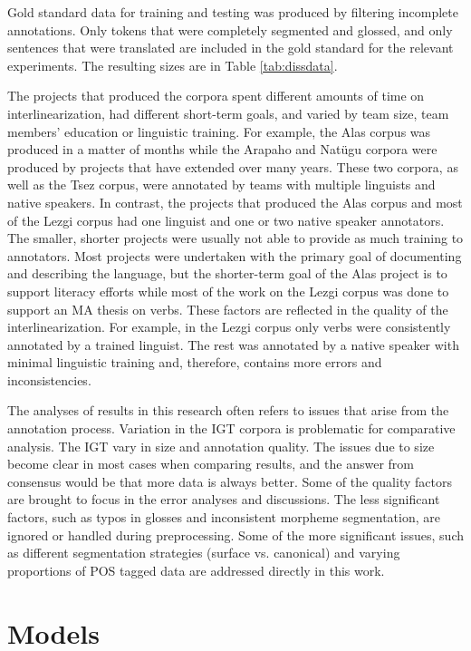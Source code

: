 Gold standard data for training and testing was produced by filtering incomplete annotations. Only tokens that were completely segmented and glossed, and only sentences that were translated are included in the gold standard for the relevant experiments. The resulting sizes are in Table \ref{tab:dissdata}.

The projects that produced the corpora spent different amounts of time on interlinearization, had different short-term goals, and varied by team size, team members' education or linguistic training. For example, the Alas corpus was produced in a matter of months while the Arapaho and Natügu corpora were produced by projects that have extended over many years. These two corpora, as well as the Tsez corpus, were annotated by teams with multiple linguists and native speakers. In contrast, the projects that produced the Alas corpus and most of the Lezgi corpus had one linguist and one or two native speaker annotators. The smaller, shorter projects were usually not able to provide as much training to annotators. Most projects were undertaken with the primary goal of documenting and describing the language, but the shorter-term goal of the Alas project is to support literacy efforts while most of the work on the Lezgi corpus was done to support an MA thesis on verbs. These factors are reflected in the quality of the interlinearization. For example, in the Lezgi corpus only verbs were consistently annotated by a trained linguist. The rest was annotated by a native speaker with minimal linguistic training and, therefore, contains more errors and inconsistencies. 

The analyses of results in this research often refers to issues that arise from the annotation process. 
Variation in the IGT corpora is problematic for comparative analysis. The IGT vary in size and annotation quality. The issues due to size become clear in most cases when comparing results, and the answer from consensus would be that more data is always better. Some of the quality factors are brought to focus in the error analyses and discussions.
The less significant factors, such as typos in glosses and inconsistent morpheme segmentation, are ignored or handled during preprocessing. Some of the more significant issues, such as different segmentation strategies (surface vs. canonical) and varying proportions of POS tagged data are addressed directly in this work.


\section{Models}
\label{sec:models}


